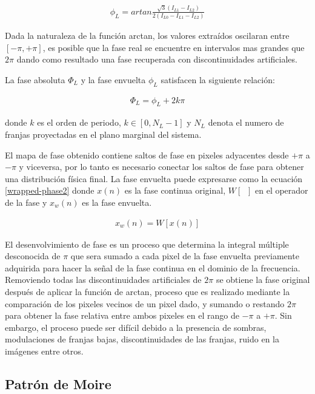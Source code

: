 \documentclass[10pt,letterpaper]{article}
\begin{document}
\begin{eqnarray}
\label{wrapped-phase-3-step}
\phi_L=artan\frac{\sqrt{3}\left ( I_{L1}- I_{L2}\right )}{2\left (I_{L0}-I_{L1}-I_{L2} \right )} 
\end{eqnarray}

Dada la naturaleza de la función arctan, los valores extraídos oscilaran entre $[-\pi,+\pi]$, es posible que la fase real se encuentre en intervalos mas grandes que $2\pi$ dando como resultado una fase recuperada con discontinuidades artificiales.

La fase absoluta $\Phi _L$ y la fase envuelta $\phi _L$ satisfacen la siguiente relación:

\begin{eqnarray}
\label{abs-wrapped-phase}
\Phi _L= \phi _L +2k\pi
\end{eqnarray}

donde $k$ es el orden de periodo, $k \in [0,N_L-1]$ y $N_L$ denota el numero de franjas proyectadas en el plano marginal del sistema. 

El mapa de fase obtenido contiene saltos de fase en pixeles adyacentes desde $+\pi$ a $-\pi$ y viceversa, por lo tanto es necesario conectar los saltos de fase para obtener una distribución física final. La fase envuelta puede expresarse como la ecuación \ref{wrapped-phase2} donde $x(n)$ es la fase continua original, $W[\;\;]$ en el operador de la fase y $x_w(n)$ es la fase envuelta.

\begin{eqnarray}
\label{wrapped-phase2}
x_w(n)= W[x(n)]
\end{eqnarray}

El desenvolvimiento de fase  es un proceso que determina la integral múltiple desconocida de $\pi$ que sera sumado a cada pixel de la fase envuelta previamente adquirida para hacer la señal de la fase continua en el dominio de la frecuencia. Removiendo todas las discontinuidades artificiales de $2\pi$ se obtiene la fase original después de aplicar la función de arctan, proceso que es realizado mediante la comparación de los pixeles vecinos de un pixel dado, y sumando o restando $2\pi$ para obtener la fase relativa entre ambos pixeles en el rango de $-\pi$ a $+\pi$. Sin embargo, el proceso puede ser difícil debido a la presencia de sombras, modulaciones de franjas bajas, discontinuidades de las franjas, ruido en la imágenes entre otros\cite{Gort:Rast}. %

\subsection{Patrón de Moire}
\end{document}
